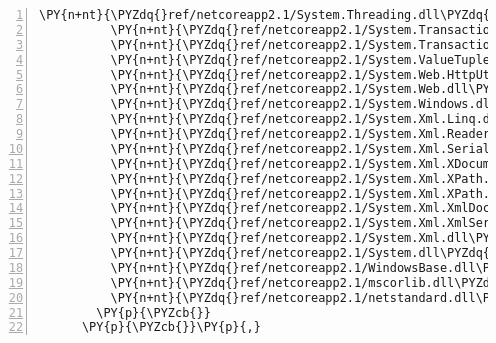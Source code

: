 \begin{Verbatim}[commandchars=\\\{\},numbers=left,firstnumber=1,stepnumber=1,numberblanklines=0]
          \PY{n+nt}{\PYZdq{}ref/netcoreapp2.1/System.Threading.dll\PYZdq{}}\PY{p}{:} \PY{p}{\PYZob{}}\PY{p}{\PYZcb{}}\PY{p}{,}
          \PY{n+nt}{\PYZdq{}ref/netcoreapp2.1/System.Transactions.Local.dll\PYZdq{}}\PY{p}{:} \PY{p}{\PYZob{}}\PY{p}{\PYZcb{}}\PY{p}{,}
          \PY{n+nt}{\PYZdq{}ref/netcoreapp2.1/System.Transactions.dll\PYZdq{}}\PY{p}{:} \PY{p}{\PYZob{}}\PY{p}{\PYZcb{}}\PY{p}{,}
          \PY{n+nt}{\PYZdq{}ref/netcoreapp2.1/System.ValueTuple.dll\PYZdq{}}\PY{p}{:} \PY{p}{\PYZob{}}\PY{p}{\PYZcb{}}\PY{p}{,}
          \PY{n+nt}{\PYZdq{}ref/netcoreapp2.1/System.Web.HttpUtility.dll\PYZdq{}}\PY{p}{:} \PY{p}{\PYZob{}}\PY{p}{\PYZcb{}}\PY{p}{,}
          \PY{n+nt}{\PYZdq{}ref/netcoreapp2.1/System.Web.dll\PYZdq{}}\PY{p}{:} \PY{p}{\PYZob{}}\PY{p}{\PYZcb{}}\PY{p}{,}
          \PY{n+nt}{\PYZdq{}ref/netcoreapp2.1/System.Windows.dll\PYZdq{}}\PY{p}{:} \PY{p}{\PYZob{}}\PY{p}{\PYZcb{}}\PY{p}{,}
          \PY{n+nt}{\PYZdq{}ref/netcoreapp2.1/System.Xml.Linq.dll\PYZdq{}}\PY{p}{:} \PY{p}{\PYZob{}}\PY{p}{\PYZcb{}}\PY{p}{,}
          \PY{n+nt}{\PYZdq{}ref/netcoreapp2.1/System.Xml.ReaderWriter.dll\PYZdq{}}\PY{p}{:} \PY{p}{\PYZob{}}\PY{p}{\PYZcb{}}\PY{p}{,}
          \PY{n+nt}{\PYZdq{}ref/netcoreapp2.1/System.Xml.Serialization.dll\PYZdq{}}\PY{p}{:} \PY{p}{\PYZob{}}\PY{p}{\PYZcb{}}\PY{p}{,}
          \PY{n+nt}{\PYZdq{}ref/netcoreapp2.1/System.Xml.XDocument.dll\PYZdq{}}\PY{p}{:} \PY{p}{\PYZob{}}\PY{p}{\PYZcb{}}\PY{p}{,}
          \PY{n+nt}{\PYZdq{}ref/netcoreapp2.1/System.Xml.XPath.XDocument.dll\PYZdq{}}\PY{p}{:} \PY{p}{\PYZob{}}\PY{p}{\PYZcb{}}\PY{p}{,}
          \PY{n+nt}{\PYZdq{}ref/netcoreapp2.1/System.Xml.XPath.dll\PYZdq{}}\PY{p}{:} \PY{p}{\PYZob{}}\PY{p}{\PYZcb{}}\PY{p}{,}
          \PY{n+nt}{\PYZdq{}ref/netcoreapp2.1/System.Xml.XmlDocument.dll\PYZdq{}}\PY{p}{:} \PY{p}{\PYZob{}}\PY{p}{\PYZcb{}}\PY{p}{,}
          \PY{n+nt}{\PYZdq{}ref/netcoreapp2.1/System.Xml.XmlSerializer.dll\PYZdq{}}\PY{p}{:} \PY{p}{\PYZob{}}\PY{p}{\PYZcb{}}\PY{p}{,}
          \PY{n+nt}{\PYZdq{}ref/netcoreapp2.1/System.Xml.dll\PYZdq{}}\PY{p}{:} \PY{p}{\PYZob{}}\PY{p}{\PYZcb{}}\PY{p}{,}
          \PY{n+nt}{\PYZdq{}ref/netcoreapp2.1/System.dll\PYZdq{}}\PY{p}{:} \PY{p}{\PYZob{}}\PY{p}{\PYZcb{}}\PY{p}{,}
          \PY{n+nt}{\PYZdq{}ref/netcoreapp2.1/WindowsBase.dll\PYZdq{}}\PY{p}{:} \PY{p}{\PYZob{}}\PY{p}{\PYZcb{}}\PY{p}{,}
          \PY{n+nt}{\PYZdq{}ref/netcoreapp2.1/mscorlib.dll\PYZdq{}}\PY{p}{:} \PY{p}{\PYZob{}}\PY{p}{\PYZcb{}}\PY{p}{,}
          \PY{n+nt}{\PYZdq{}ref/netcoreapp2.1/netstandard.dll\PYZdq{}}\PY{p}{:} \PY{p}{\PYZob{}}\PY{p}{\PYZcb{}}
        \PY{p}{\PYZcb{}}
      \PY{p}{\PYZcb{}}\PY{p}{,}

\end{Verbatim}
